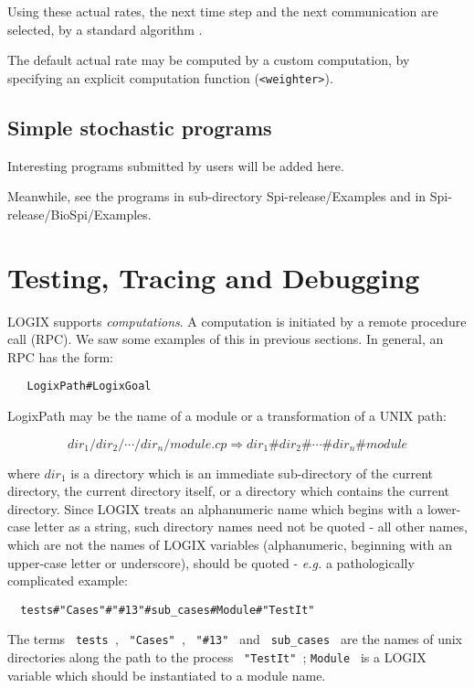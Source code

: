 Using these actual rates, the next time step and the next
communication are selected, by a standard algorithm \cite{Gil77}.

The default actual rate may be computed by a custom computation,
by specifying an explicit computation function (\verb+<weighter>+).

\section{Simple stochastic programs}
 
Interesting programs submitted by users will be added here.
\newline

\noindent
Meanwhile, see the programs in sub-directory Spi-release/Examples
and in Spi-release/BioSpi/Examples.

\chapter{Testing, Tracing and Debugging}
\label{debug}

LOGIX supports {\em computations}.  A computation is initiated by
a remote procedure call (RPC).  We saw some examples of this in
previous sections.  In general, an RPC has the form:

\begin{verbatim}
   LogixPath#LogixGoal
\end{verbatim}

\noindent
LogixPath may be the name of a module or a transformation of a UNIX path:

\[dir_{1}/dir_{2}/ \cdots /dir_{n}/module.cp  \Rightarrow  dir_{1}\#dir_{2}\# \cdots \#dir_{n}\#module\]

\noindent
where $dir_{1}$ is a directory which is an immediate sub-directory
of the current directory, the current directory itself, or a directory
which contains the current directory.
Since LOGIX treats an alphanumeric name which begins with a lower-case
letter as a string, such directory names need not be quoted - all
other names, which are not the names of LOGIX variables (alphanumeric,
beginning with an upper-case letter or underscore), should be quoted -
{\em e.g.} a pathologically complicated example:

\begin{verbatim}
  tests#"Cases"#"#13"#sub_cases#Module#"TestIt"
\end{verbatim}

\noindent
The terms \verb+ tests +, \verb+ "Cases" +, \verb+ "#13" + and
\verb+ sub_cases + are the names of unix directories along the
path to the process  \verb+ "TestIt" +;
\verb+Module + is a LOGIX variable which should be instantiated to a
module name.

